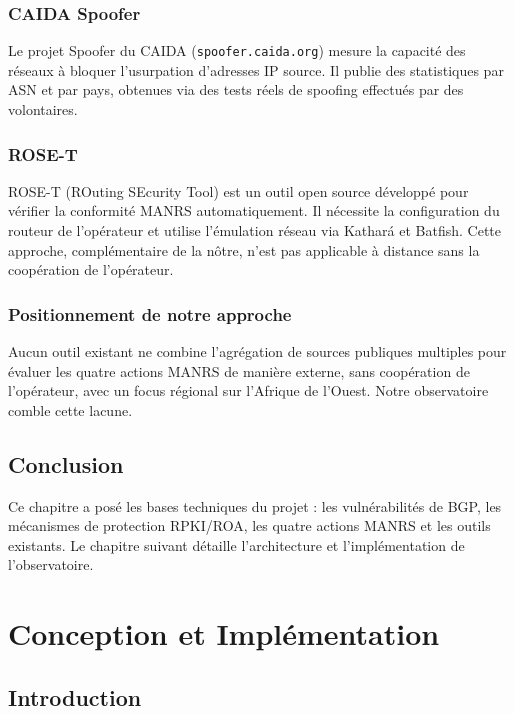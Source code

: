 \documentclass{eneam}
\begin{document}
\subsection{CAIDA Spoofer}

Le projet Spoofer du CAIDA (\texttt{spoofer.caida.org}) mesure la capacité des réseaux à bloquer l'usurpation d'adresses IP source. Il publie des statistiques par ASN et par pays, obtenues via des tests réels de spoofing effectués par des volontaires.

\subsection{ROSE-T}

ROSE-T (ROuting SEcurity Tool) est un outil open source développé pour vérifier la conformité MANRS automatiquement. Il nécessite la configuration du routeur de l'opérateur et utilise l'émulation réseau via Kathará et Batfish. Cette approche, complémentaire de la nôtre, n'est pas applicable à distance sans la coopération de l'opérateur.

\subsection{Positionnement de notre approche}

Aucun outil existant ne combine l'agrégation de sources publiques multiples pour évaluer les quatre actions MANRS de manière externe, sans coopération de l'opérateur, avec un focus régional sur l'Afrique de l'Ouest. Notre observatoire comble cette lacune.

\section{Conclusion}

Ce chapitre a posé les bases techniques du projet : les vulnérabilités de BGP, les mécanismes de protection RPKI/ROA, les quatre actions MANRS et les outils existants. Le chapitre suivant détaille l'architecture et l'implémentation de l'observatoire.


\chapter{Conception et Implémentation}

\section{Introduction}
\end{document}
